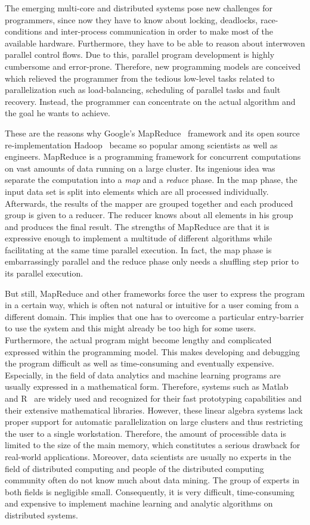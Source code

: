 The emerging multi-core and distributed systems pose new challenges for programmers, since now they have to know about locking, deadlocks, race-conditions and inter-process communication in order to make most of the available hardware.
Furthermore, they have to be able to reason about interwoven parallel control flows.
Due to this, parallel program development is highly cumbersome and error-prone.
Therefore, new programming models are conceived which relieved the programmer from the tedious low-level tasks related to parallelization such as load-balancing, scheduling of parallel tasks and fault recovery.
Instead, the programmer can concentrate on the actual algorithm and the goal he wants to achieve.

These are the reasons why Google's MapReduce~\cite{dean:c2008a} framework and its open source re-implementation Hadoop~\cite{hadoop:2008a} became so popular among scientists as well as engineers.
MapReduce is a programming framework for concurrent computations on vast amounts of data running on a large cluster.
Its ingenious idea was separate the computation into a \emph{map} and a \emph{reduce} phase.
In the map phase, the input data set is split into elements which are all processed individually.
Afterwards, the results of the mapper are grouped together and each produced group is given to a reducer.
The reducer knows about all elements in his group and produces the final result.
The strengths of MapReduce are that it is expressive enough to implement a multitude of different algorithms while facilitating at the same time parallel execution.
In fact, the map phase is embarrassingly parallel and the reduce phase only needs a shuffling step prior to its parallel execution.

But still, MapReduce and other frameworks force the user to express the program in a certain way, which is often not natural or intuitive for a user coming from a different domain.
This implies that one has to overcome a particular entry-barrier to use the system and this might already be too high for some users.
Furthermore, the actual program might become lengthy and complicated expressed within the programming model.
This makes developing and debugging the program difficult as well as time-consuming and eventually expensive.
Especially, in the field of data analytics and machine learning programs are usually expressed in a mathematical form.
Therefore, systems such as Matlab~\cite{matlab} and R~\cite{r:1993a} are widely used and recognized for their fast prototyping capabilities and their extensive mathematical libraries.
However, these linear algebra systems lack proper support for automatic parallelization on large clusters and thus restricting the user to a single workstation.
Therefore, the amount of processible data is limited to the size of the main memory, which constitutes a serious drawback for real-world applications.
Moreover, data scientists are usually no experts in the field of distributed computing and people of the distributed computing community often do not know much about data mining.
The group of experts in both fields is negligible small.
Consequently, it is very difficult, time-consuming and expensive to implement machine learning and analytic algorithms on distributed systems.

